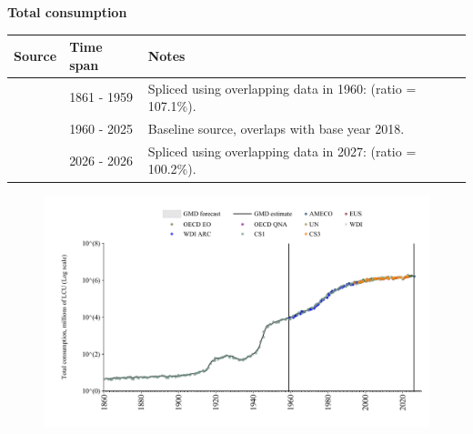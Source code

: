 \documentclass[12pt,a4paper,landscape]{article}
\begin{document}
\begin{adjustbox}{max totalsize={\paperwidth}{\paperheight},center}
\begin{minipage}[t][\textheight][t]{\textwidth}
\vspace*{0.5cm}
{}
\begin{center}
{\Large\bfseries Total consumption}
\end{center}
\vspace{0.5cm}
\begin{table}[H]
\centering
\small
\begin{tabular}{|l|l|l|}
\hline
\textbf{Source} & \textbf{Time span} & \textbf{Notes} \\
\hline
\rowcolor{white}\cite{CS1_ITA}& 1861 - 1959 &Spliced using overlapping data in 1960: (ratio = 107.1\%). \\
\rowcolor{lightgray}\cite{OECD_EO}& 1960 - 2025 &Baseline source, overlaps with base year 2018. \\
\rowcolor{white}\cite{AMECO}& 2026 - 2026 &Spliced using overlapping data in 2027: (ratio = 100.2\%). \\
\hline
\end{tabular}
\end{table}
\begin{figure}[H]
\centering
\includegraphics[width=\textwidth,height=0.6\textheight,keepaspectratio]{graphs/ITA_cons.pdf}
\end{figure}
\end{minipage}
\end{adjustbox}
\end{document}
